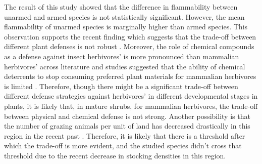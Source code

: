 \documentclass[12pt]{report}
\begin{document}
The result of this study showed that the difference in flammability between unarmed and armed species is not statistically significant. However, the mean flammability of unarmed species is marginally higher than armed species. This observation supports the recent finding which suggests that the trade-off between different plant defenses is not robust \citep{moles2013correlations}. Moreover, the role of chemical compounds as a defense against insect herbivores' \citep{herms1992dilemma, ohgushi2005indirect} is more pronounced than mammalian herbivores' \citep{wigley2015mammal} across literature and
studies suggested that the ability of chemical deterrents to stop consuming preferred plant materials for mammalian herbivores is limited \citep{cooper1985condensed, cooper1988foliage}. Therefore, though there might be a significant trade-off between different defense strategies against herbivores' in different developmental stages in plants, it is likely that, in mature shrubs, for mammalian herbivores, the trade-off between physical and chemical defense is not strong. Another possibility is that the number of grazing animals per unit of land has decreased drastically in this region in the recent past \citep{wilcox2012historicalgrazing2}. Therefore, it is likely that there is a threshold after which the
trade-off is more evident, and the studied species didn’t cross that threshold due to
the recent decrease in stocking densities in this region.




\end{document}
